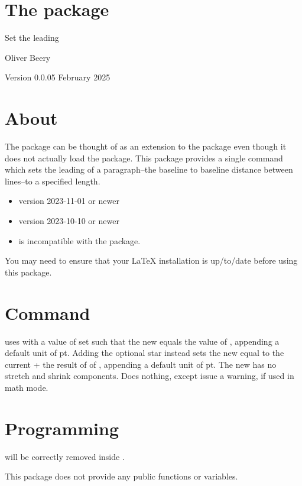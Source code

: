 \documentclass{beery}
\begin{document}
\section*
  {%
    The  package%
  }

Set the leading

Oliver Beery

Version 0.0.0\quad{}5 February 2025


\section{About}
\label{sec:about}

The  package can be thought of as an extension to the  package even though it does not actually load the  package.
This package provides a single command  which sets the leading of a paragraph\---the baseline to baseline distance between lines\---to a specified length.

\begin{itemize}
  \item \LaTeXe{} version 2023-11-01 or newer
  \item {} version 2023-10-10 or newer
  \item {} is incompatible with the  package.
\end{itemize}

You may need to ensure that your \LaTeX{} installation is up\-/to\-/date before using this package.


\section{Command}
\label{sec:command}

\begin{mydisplaycode}
   \sarg{} 
\end{mydisplaycode}

 uses  with a value of  set such that the new  equals the value of , appending a default unit of \unit{pt}.
Adding the optional star \sarg{} instead sets the new  equal to the current  + the result of of , appending a default unit of \unit{pt}.
The new  has no stretch and shrink components.
Does nothing, except issue a warning, if used in math mode.


\section{Programming}
\label{sec:programming}

 will be correctly removed inside .

This package does not provide any public  functions or variables.
\end{document}

